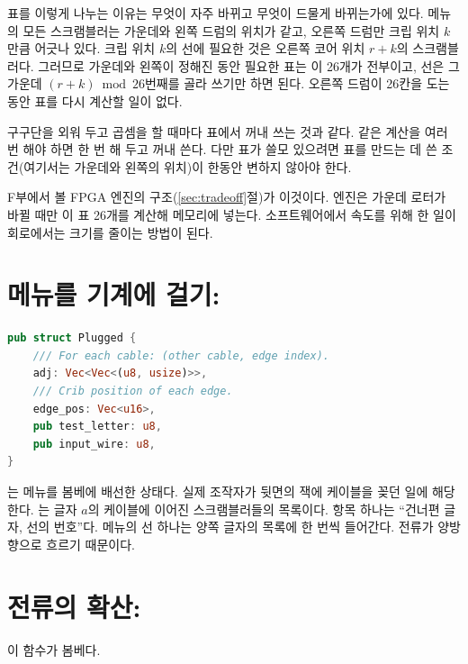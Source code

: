 \Why 표를 이렇게 나누는 이유는 무엇이 자주 바뀌고 무엇이 드물게 바뀌는가에 있다. 메뉴의 모든 스크램블러는
가운데와 왼쪽 드럼의 위치가 같고, 오른쪽 드럼만 크립 위치 $k$만큼 어긋나 있다. 크립 위치 $k$의 선에 필요한
것은 오른쪽 코어 위치 $r+k$의 스크램블러다. 그러므로 가운데와 왼쪽이 정해진 동안 필요한 표는 이 26개가
전부이고, 선은 그 가운데 $(r+k) \bmod 26$번째를 골라 쓰기만 하면 된다. 오른쪽 드럼이 26칸을 도는 동안
표를 다시 계산할 일이 없다.

\General 구구단을 외워 두고 곱셈을 할 때마다 표에서 꺼내 쓰는 것과 같다. 같은 계산을 여러 번 해야 하면
한 번 해 두고 꺼내 쓴다. 다만 표가 쓸모 있으려면 표를 만드는 데 쓴 조건(여기서는 가운데와 왼쪽의 위치)이
한동안 변하지 않아야 한다.

\Ours F부에서 볼 FPGA 엔진의 구조(\ref{sec:tradeoff}절)가 이것이다. 엔진은 가운데 로터가 바뀔 때만 이 표
26개를 계산해 메모리에 넣는다. 소프트웨어에서 속도를 위해 한 일이 회로에서는 크기를 줄이는 방법이 된다.

\section{메뉴를 기계에 걸기: \texorpdfstring{}{Plugged}}

\begin{lstlisting}[language=Rust,caption={\code{bombe.rs}: 배선된 메뉴.}]
pub struct Plugged {
    /// For each cable: (other cable, edge index).
    adj: Vec<Vec<(u8, usize)>>,
    /// Crib position of each edge.
    edge_pos: Vec<u16>,
    pub test_letter: u8,
    pub input_wire: u8,
}
\end{lstlisting}

는 메뉴를 봄베에 배선한 상태다. 실제 조작자가 뒷면의 잭에 케이블을 꽂던 일에 해당한다.
는 글자 $a$의 케이블에 이어진 스크램블러들의 목록이다. 항목 하나는 ``건너편 글자, 선의 번호''다.
메뉴의 선 하나는 양쪽 글자의 목록에 한 번씩 들어간다. 전류가 양방향으로 흐르기 때문이다.

\section{전류의 확산: \texorpdfstring{}{propagate}}\label{sec:propagate}

이 함수가 봄베다.

